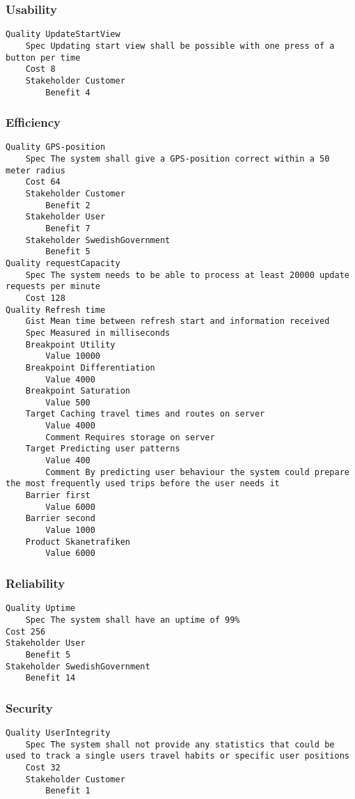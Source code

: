 \begin{lstlisting}

\end{lstlisting}


			 \subsubsection{Usability}


\begin{lstlisting}
Quality UpdateStartView
	Spec Updating start view shall be possible with one press of a button per time
	Cost 8
	Stakeholder Customer
		Benefit 4

\end{lstlisting}
		
				
			 \subsubsection{Efficiency}


\begin{lstlisting}
Quality GPS-position
	Spec The system shall give a GPS-position correct within a 50 meter radius
	Cost 64
	Stakeholder Customer
		Benefit 2
	Stakeholder User
		Benefit 7
	Stakeholder SwedishGovernment
		Benefit 5
Quality requestCapacity
	Spec The system needs to be able to process at least 20000 update requests per minute
	Cost 128
Quality Refresh time
	Gist Mean time between refresh start and information received
	Spec Measured in milliseconds
	Breakpoint Utility
		Value 10000
	Breakpoint Differentiation
		Value 4000
	Breakpoint Saturation
		Value 500
	Target Caching travel times and routes on server
		Value 4000
		Comment Requires storage on server
	Target Predicting user patterns
		Value 400
		Comment By predicting user behaviour the system could prepare the most frequently used trips before the user needs it
	Barrier first
		Value 6000
	Barrier second
		Value 1000
	Product Skanetrafiken
		Value 6000

\end{lstlisting}
		
				
			 \subsubsection{Reliability}


\begin{lstlisting}
Quality Uptime
	Spec The system shall have an uptime of 99%
Cost 256
Stakeholder User
	Benefit 5
Stakeholder SwedishGovernment
	Benefit 14

\end{lstlisting}
		
				
			 \subsubsection{Security}


\begin{lstlisting}
Quality UserIntegrity
	Spec The system shall not provide any statistics that could be used to track a single users travel habits or specific user positions
	Cost 32
	Stakeholder Customer
		Benefit 1

\end{lstlisting}